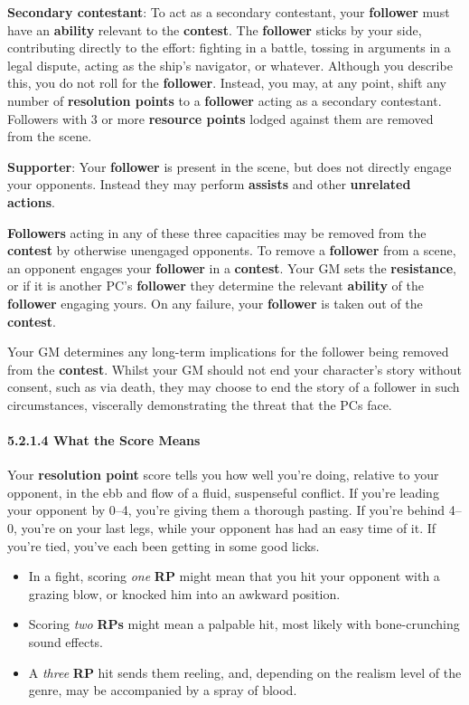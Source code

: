 \documentclass[
  11pt,
]{article}
\providecommand{\tightlist}{%
  \setlength{\itemsep}{0pt}\setlength{\parskip}{0pt}}
\begin{document}
\textbf{Secondary contestant}: To act as a secondary contestant, your
\textbf{follower} must have an \textbf{ability} relevant to the
\textbf{contest}. The \textbf{follower} sticks by your side,
contributing directly to the effort: fighting in a battle, tossing in
arguments in a legal dispute, acting as the ship's navigator, or
whatever. Although you describe this, you do not roll for the
\textbf{follower}. Instead, you may, at any point, shift any number of
\textbf{resolution points} to a \textbf{follower} acting as a secondary
contestant. Followers with 3 or more \textbf{resource points} lodged
against them are removed from the scene.

\textbf{Supporter}: Your \textbf{follower} is present in the scene, but
does not directly engage your opponents. Instead they may perform
\textbf{assists} and other \textbf{unrelated actions}.

\textbf{Followers} acting in any of these three capacities may be
removed from the \textbf{contest} by otherwise unengaged opponents. To
remove a \textbf{follower} from a scene, an opponent engages your
\textbf{follower} in a \textbf{contest}. Your GM sets the
\textbf{resistance}, or if it is another PC's \textbf{follower} they
determine the relevant \textbf{ability} of the \textbf{follower}
engaging yours. On any failure, your \textbf{follower} is taken out of
the \textbf{contest}.

Your GM determines any long-term implications for the follower being
removed from the \textbf{contest}. Whilst your GM should not end your
character's story without consent, such as via death, they may choose to
end the story of a follower in such circumstances, viscerally
demonstrating the threat that the PCs face.

\hypertarget{what-the-score-means}{%
\paragraph{5.2.1.4 What the Score Means}\label{what-the-score-means}}

Your \textbf{resolution point} score tells you how well you're doing,
relative to your opponent, in the ebb and flow of a fluid, suspenseful
conflict. If you're leading your opponent by 0--4, you're giving them a
thorough pasting. If you're behind 4--0, you're on your last legs, while
your opponent has had an easy time of it. If you're tied, you've each
been getting in some good licks.

\begin{itemize}
\tightlist
\item
  In a fight, scoring \emph{one} \textbf{RP} might mean that you hit
  your opponent with a grazing blow, or knocked him into an awkward
  position.
\item
  Scoring \emph{two} \textbf{RPs} might mean a palpable hit, most likely
  with bone-crunching sound effects.
\item
  A \emph{three} \textbf{RP} hit sends them reeling, and, depending on
  the realism level of the genre, may be accompanied by a spray of
  blood.
\end{itemize}
\end{document}
